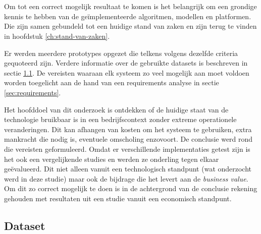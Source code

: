 
\chapter{}
\label{ch:methodologie}


Om tot een correct mogelijk resultaat te komen is het belangrijk om een grondige kennis te hebben van de geïmplementeerde algoritmen, modellen en platformen. Die zijn samen gebundeld tot een huidige stand van zaken en zijn terug te vinden in hoofdstuk \ref{ch:stand-van-zaken}.

Er werden meerdere prototypes opgezet die telkens volgens dezelfde criteria gequoteerd zijn. Verdere informatie over de gebruikte datasets is beschreven in sectie \ref{sec:datasets}. De vereisten waaraan elk systeem zo veel mogelijk aan moet voldoen worden toegelicht aan de hand van een requirements analyse in sectie \ref{sec:requirements}.

Het hoofddoel van dit onderzoek is ontdekken of de huidige staat van de technologie bruikbaar is in een bedrijfscontext zonder extreme operationele veranderingen. Dit kan afhangen van kosten om het systeem te gebruiken, extra mankracht die nodig is, eventuele omscholing enzovoort. De conclusie werd rond die vereisten geformuleerd. Omdat er verschillende implementaties getest zijn is het ook een vergelijkende studies en werden ze onderling tegen elkaar geëvalueerd. Dit niet alleen vanuit een technologisch standpunt (wat onderzocht werd in deze studie) maar ook de bijdrage die het levert aan de \textit{business value}. Om dit zo correct mogelijk te doen is in de achtergrond van de conclusie rekening gehouden met resultaten uit een studie vanuit een economisch standpunt. 

\section{Dataset}
\label{sec:datasets}

